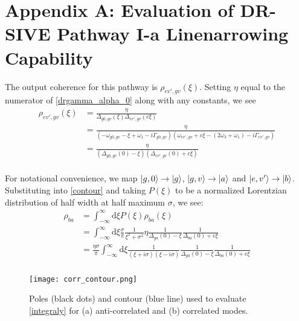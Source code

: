 \documentclass[aip, jcp, reprint, onecolumn]{revtex4-2}
\begin{document}
\section{Appendix A: Evaluation of DR-SIVE Pathway I-a Linenarrowing Capability}
\begin{widetext}
The output coherence  for this pathway is $\rho_{ev',gv}(\xi)$.
Setting $\eta$ equal to the numerator of \autoref{drgamma_alpha_0} along with any constants, we see
\begin{equation}\label{ev'gv}
	\begin{split}
		\rho_{ev',gv}(\xi) &= \frac{\eta}{\Delta_{g0,gv}(\xi) \Delta_{ev',gv}(c\xi)}\\
		&=  \frac{\eta}{(-\omega_{g0,gv} - \xi + \omega_1 - i\Gamma_{g0,gv})(\omega_{ev',gv} + c\xi - (2\omega_3 + \omega_1) - i\Gamma_{ev',gv})}\\ 
		&= \frac{\eta}{(\Delta_{g0,gv}(0) - \xi)(\Delta_{ev',gv}(0) + c\xi)}\\ 
	\end{split}
\end{equation}

For notational convenience, we map $\ket{g,0} \rightarrow \ket{g}$, $\ket{g,v} \rightarrow \ket{a}$ and $\ket{e,v'} \rightarrow \ket{b}$.
Substituting into \autoref{contour} and taking $P(\xi)$ to be a normalized Lorentzian distribution of half width at half maximum $\sigma$, we see:
\begin{equation}\label{integraly}
	\begin{split}
		\rho_{ba} &= \int_{-\infty}^\infty \mathrm{d}\xi P(\xi) \rho_{ba}(\xi)\\
		&= \int_{-\infty}^\infty \mathrm{d}\xi \frac{\sigma}{\pi} \frac{1}{\xi^2 + \sigma^2} \eta \frac{1}{\Delta_{ga}(0) - \xi} \frac{1}{\Delta_{ba}(0) + c\xi}\\
		&= \frac{\eta \sigma}{\pi} \int_{-\infty}^\infty \mathrm{d}\xi\frac{1}{(\xi + i\sigma)(\xi - i\sigma)} \frac{1}{\Delta_{ga}(0) - \xi} \frac{1}{\Delta_{ba}(0) + c\xi}\\
	\end{split}
\end{equation}

\begin{figure}[!htbp]
	\centering
	\texttt{[image: corr\_contour.png]}
	\caption{Poles (black dots) and contour (blue line) used to evaluate \autoref{integraly} for (a) anti-correlated and (b) correlated modes.} 
	\label{fig:contours}
\end{figure}


\end{widetext}
\end{document}
